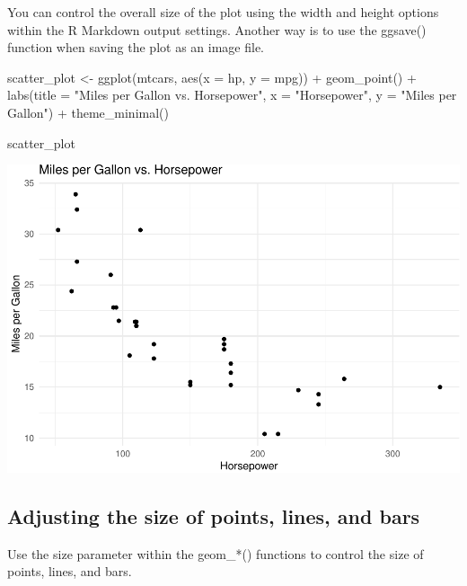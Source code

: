 \documentclass[
]{book}
\newenvironment{Shaded}{\begin{snugshade}}{\end{snugshade}}
\newcommand{\AttributeTok}[1]{\textcolor[rgb]{0.77,0.63,0.00}{#1}}
\newcommand{\FunctionTok}[1]{\textcolor[rgb]{0.00,0.00,0.00}{#1}}
\newcommand{\NormalTok}[1]{#1}
\newcommand{\OtherTok}[1]{\textcolor[rgb]{0.56,0.35,0.01}{#1}}
\newcommand{\SpecialCharTok}[1]{\textcolor[rgb]{0.00,0.00,0.00}{#1}}
\newcommand{\StringTok}[1]{\textcolor[rgb]{0.31,0.60,0.02}{#1}}
\begin{document}
You can control the overall size of the plot using the width and height options within the R Markdown output settings. Another way is to use the ggsave() function when saving the plot as an image file.

\begin{Shaded}
\begin{Highlighting}[]
\NormalTok{scatter\_plot }\OtherTok{\textless{}{-}} \FunctionTok{ggplot}\NormalTok{(mtcars, }\FunctionTok{aes}\NormalTok{(}\AttributeTok{x =}\NormalTok{ hp, }\AttributeTok{y =}\NormalTok{ mpg)) }\SpecialCharTok{+}
  \FunctionTok{geom\_point}\NormalTok{() }\SpecialCharTok{+}
  \FunctionTok{labs}\NormalTok{(}\AttributeTok{title =} \StringTok{"Miles per Gallon vs. Horsepower"}\NormalTok{,}
       \AttributeTok{x =} \StringTok{"Horsepower"}\NormalTok{,}
       \AttributeTok{y =} \StringTok{"Miles per Gallon"}\NormalTok{) }\SpecialCharTok{+}
  \FunctionTok{theme\_minimal}\NormalTok{()}

\NormalTok{scatter\_plot}
\end{Highlighting}
\end{Shaded}

\includegraphics[width=1\linewidth]{graphformatting_files/figure-latex/unnamed-chunk-8-1}

\hypertarget{adjusting-the-size-of-points-lines-and-bars}{%
\subsection{Adjusting the size of points, lines, and bars}\label{adjusting-the-size-of-points-lines-and-bars}}

Use the size parameter within the geom\_*() functions to control the size of points, lines, and bars.
\end{document}

